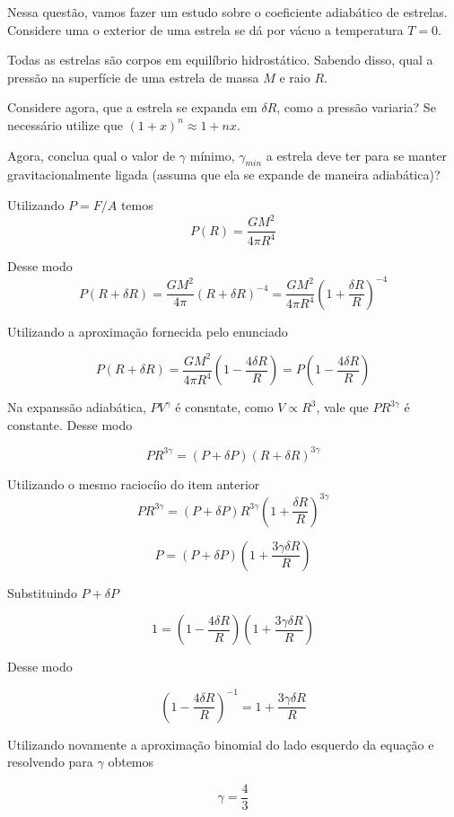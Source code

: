 \documentclass[11pt]{article}
\begin{document}
\begin{pproblem}
    Nessa questão, vamos fazer um estudo sobre o coeficiente adiabático de estrelas. Considere uma o exterior de uma estrela se dá por vácuo a temperatura \(T=0\).
    \begin{alternativas}
        \item Todas as estrelas são corpos em equilíbrio hidrostático. Sabendo disso, qual a pressão na superfície de uma estrela de massa \(M\) e raio \(R\).
        \item Considere agora, que a estrela se expanda em \(\delta R\), como a pressão variaria? Se necessário utilize que \((1+x)^n\approx 1+nx\).
        \item Agora, conclua qual o valor de \(\gamma\) mínimo, \(\gamma_{min}\) a estrela deve ter para se manter gravitacionalmente ligada (assuma que ela se expande de maneira adiabática)?
    \end{alternativas}

\begin{pssolution*}{}{}
    \begin{alternativas}
        \item Utilizando \(P = F/A\) temos
        \[P(R) = \frac{GM^2}{4\pi R^4}\]

        \item Desse modo 
        \[P(R+\delta R)  = \frac{GM^2}{4\pi}(R+\delta R)^{-4} = \frac{GM^2}{4\pi R^4}\left(1+\frac{\delta R}{R}\right)^{-4}\]

        Utilizando a aproximação fornecida pelo enunciado 

        \[\boxed{P(R+\delta R) = \frac{GM^2}{4\pi R^4}\left(1-\frac{4\delta R}{R}\right) = P\left(1-\frac{4\delta R}{R}\right)}\]
    
        \item Na expanssão adiabática, \(PV^\gamma\) é consntate, como \(V\propto R^3\), vale que \(PR^{3\gamma}\) é constante. Desse modo
        
        \[PR^{3\gamma} = (P+\delta P)(R + \delta R)^{3\gamma}\]

        Utilizando o mesmo raciocíio do item anterior
        \[PR^{3\gamma} = (P+\delta P)R^{3\gamma}\left(1 + \frac{\delta R}{R}\right)^{3\gamma}\]

        \[P = (P+ \delta P)\left(1+\frac{3\gamma\delta R}{R}\right)\]

        Substituindo \(P+\delta P\) 

        \[1 = \left(1-\frac{4\delta R}{R}\right)\left(1+\frac{3\gamma\delta R}{R}\right)\]

        Desse modo 

        \[\left(1-\frac{4\delta R}{R}\right)^{-1} = 1+\frac{3\gamma\delta R}{R}\]

        Utilizando novamente a aproximação binomial do lado esquerdo da equação e resolvendo para \(\gamma\) obtemos

        \[\boxed{\gamma = \frac{4}{3}}\]
    \end{alternativas}
    
\end{pssolution*}
\end{pproblem}
\end{document}
